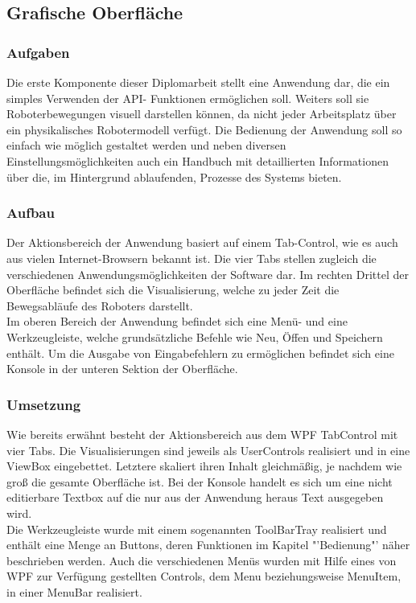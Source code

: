 
\subsection{Grafische Oberfläche}

\subsubsection{Aufgaben}
Die erste Komponente dieser Diplomarbeit stellt eine Anwendung dar, die ein simples Verwenden der API- Funktionen ermöglichen soll. Weiters soll sie Roboterbewegungen visuell darstellen können, da nicht jeder Arbeitsplatz über ein physikalisches Robotermodell verfügt. 
Die Bedienung der Anwendung soll so einfach wie möglich gestaltet werden und neben diversen Einstellungsmöglichkeiten auch ein Handbuch mit detaillierten Informationen über die, im Hintergrund ablaufenden, Prozesse des Systems bieten.
\subsubsection{Aufbau}
Der Aktionsbereich der Anwendung basiert auf einem Tab-Control, wie es auch aus vielen Internet-Browsern bekannt ist. Die vier Tabs stellen zugleich die verschiedenen Anwendungsmöglichkeiten der Software dar. Im rechten Drittel der Oberfläche befindet sich die Visualisierung, welche zu jeder Zeit die Bewegsabläufe des Roboters darstellt. \\
Im oberen Bereich der Anwendung befindet sich eine Menü- und eine Werkzeugleiste, welche grundsätzliche Befehle wie Neu, Öffen und Speichern enthält. Um die Ausgabe von Eingabefehlern zu ermöglichen befindet sich eine Konsole in der unteren Sektion der Oberfläche.
\subsubsection{Umsetzung}
Wie bereits erwähnt besteht der Aktionsbereich aus dem WPF TabControl mit vier Tabs. Die Visualisierungen sind jeweils als UserControls realisiert und in eine ViewBox eingebettet. Letztere skaliert ihren Inhalt gleichmäßig, je nachdem wie groß die gesamte Oberfläche ist. Bei der Konsole handelt es sich um eine nicht editierbare Textbox auf die nur aus der Anwendung heraus Text ausgegeben wird. \\
Die Werkzeugleiste wurde mit einem sogenannten ToolBarTray realisiert und enthält eine Menge an Buttons, deren Funktionen im Kapitel "'Bedienung"' näher beschrieben werden. Auch die verschiedenen Menüs wurden mit Hilfe eines von WPF zur Verfügung gestellten Controls, dem Menu beziehungsweise MenuItem, in einer MenuBar realisiert.
